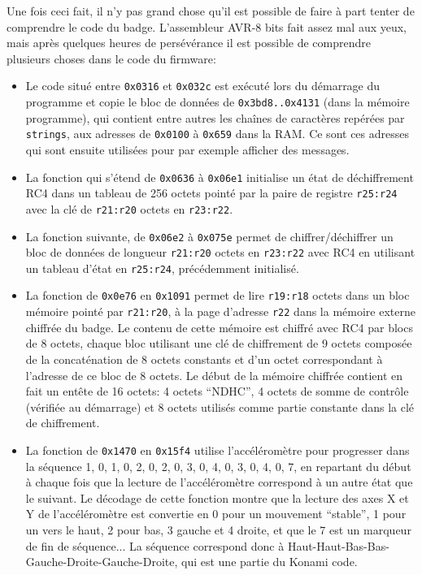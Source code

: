 \documentclass[11pt]{article}
\newcommand{\ttt}[1]{\texttt{#1}}
\begin{document}
    Une fois ceci fait, il n'y pas grand chose qu'il est possible de faire à part tenter de comprendre le code du badge. L'assembleur AVR-8 bits fait assez mal aux yeux, mais après quelques heures de persévérance il est possible de comprendre plusieurs choses dans le code du firmware:
\begin{itemize}
  \item Le code situé entre \ttt{0x0316} et \ttt{0x032c} est exécuté lors du démarrage du programme et copie le bloc de données de \ttt{0x3bd8..0x4131} (dans la mémoire programme), qui contient entre autres les chaînes de caractères repérées par \ttt{strings}, aux adresses de \ttt{0x0100} à \ttt{0x659} dans la RAM. Ce sont ces adresses qui sont ensuite utilisées pour par exemple afficher des messages.
  \item La fonction qui s'étend de \ttt{0x0636} à \ttt{0x06e1} initialise un état de déchiffrement RC4 dans un tableau de 256 octets pointé par la paire de registre \ttt{r25:r24} avec la clé de \ttt{r21:r20} octets en \ttt{r23:r22}.
  \item La fonction suivante, de \ttt{0x06e2} à \ttt{0x075e} permet de chiffrer/déchiffrer un bloc de données de longueur \ttt{r21:r20} octets en \ttt{r23:r22} avec RC4 en utilisant un tableau d'état en \ttt{r25:r24}, précédemment initialisé.
  \item La fonction de \ttt{0x0e76} en \ttt{0x1091} permet de lire \ttt{r19:r18} octets dans un bloc mémoire pointé par \ttt{r21:r20}, à la page d'adresse \ttt{r22} dans la mémoire externe chiffrée du badge. Le contenu de cette mémoire est chiffré avec RC4 par blocs de 8 octets, chaque bloc utilisant une clé de chiffrement de 9 octets composée de la concaténation de 8 octets constants et d'un octet correspondant à l'adresse de ce bloc de 8 octets. Le début de la mémoire chiffrée contient en fait un entête de 16 octets: 4 octets ``NDHC'', 4 octets de somme de contrôle (vérifiée au démarrage) et 8 octets utilisés comme partie constante dans la clé de chiffrement.
  \item La fonction de \ttt{0x1470} en \ttt{0x15f4} utilise l'accéléromètre pour progresser dans la séquence 1, 0, 1, 0, 2, 0, 2, 0, 3, 0, 4, 0, 3, 0, 4, 0, 7, en repartant du début à chaque fois que la lecture de l'accéléromètre correspond à un autre état que le suivant. Le décodage de cette fonction montre que la lecture des axes X et Y de l'accéléromètre est convertie en 0 pour un mouvement ``stable'', 1 pour un vers le haut, 2 pour bas, 3 gauche et 4 droite, et que le 7 est un marqueur de fin de séquence... La séquence correspond donc à Haut-Haut-Bas-Bas-Gauche-Droite-Gauche-Droite, qui est une partie du Konami code.
\end{itemize}
\end{document}
